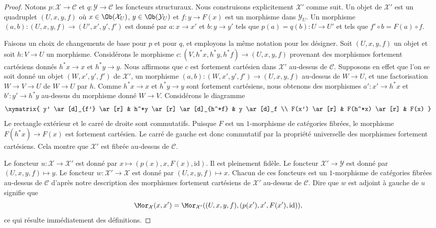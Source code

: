 \begin{proof}
Notons $p : \mathcal{X} \to \mathcal{C}$ et
$q : \mathcal{Y} \to \mathcal{C}$ les foncteurs structuraux.
Nous construisons explicitement $\mathcal{X}'$ comme suit.
Un objet de $\mathcal{X}'$ est un quadruplet $(U, x, y, f)$ où
$x \in \Ob(\mathcal{X}_U)$, $y \in \Ob(\mathcal{Y}_U)$
et $f : y \to F(x)$ est un morphisme dans $\mathcal{Y}_U$.
Un morphisme $(a, b) : (U, x, y, f) \to (U', x', y', f')$ est donné
par $a : x \to x'$ et $b : y \to y'$ tels que
$p(a) = q(b) : U \to U'$ et tels que
$f' \circ b = F(a) \circ f$.

\medskip\noindent
Faisons un choix de changements de base pour $p$ et pour $q$, et employons
la même notation pour les désigner.
Soit $(U, x, y, f)$ un objet et soit $h : V \to U$ un morphisme.
Considérons le morphisme
$c : (V, h^*x, h^*y, h^*f) \to (U, x, y, f)$
provenant des morphismes fortement cartésiens donnés
$h^*x \to x$ et $h^*y \to y$.
Nous affirmons que $c$ est fortement cartésien dans $\mathcal{X}'$
au-dessus de $\mathcal{C}$.
Supposons en effet que l'on se soit donné un objet
$(W, x', y', f')$ de $\mathcal{X}'$, un morphisme
$(a, b) : (W, x', y', f') \to (U, x, y, f)$ au-dessus de
$W \to U$, et une factorisation $W \to V \to U$ de $W \to U$ par $h$.
Comme $h^*x \to x$ et $h^*y \to y$ sont fortement cartésiens, nous obtenons
des morphismes $a' : x' \to h^*x$ et $b' : y' \to h^*y$ au-dessus du
morphisme donné $W \to V$. Considérons le diagramme
$$
\xymatrix{
y' \ar[d]_{f'} \ar[r] & h^*y \ar[r] \ar[d]_{h^*f} & y \ar[d]_f \\
F(x') \ar[r] & F(h^*x) \ar[r] & F(x)
}
$$
Le rectangle extérieur et le carré de droite sont commutatifs.
Puisque $F$ est un $1$-morphisme de catégories fibrées, le morphisme
$F(h^*x) \to F(x)$ est fortement cartésien.
Le carré de gauche est donc commutatif par la propriété universelle des
morphismes fortement cartésiens. Cela montre que $\mathcal{X}'$
est fibrée au-dessus de $\mathcal{C}$.

\medskip\noindent
Le foncteur $u : \mathcal{X} \to \mathcal{X}'$ est donné par
$x \mapsto (p(x), x, F(x), \text{id})$. Il est pleinement fidèle.
Le foncteur $\mathcal{X}' \to \mathcal{Y}$ est donné par
$(U, x, y, f) \mapsto y$. Le foncteur
$w : \mathcal{X}' \to \mathcal{X}$ est donné par
$(U, x, y, f) \mapsto x$. Chacun de ces foncteurs est un
$1$-morphisme de catégories fibrées au-dessus de $\mathcal{C}$ d'après
notre description des morphismes fortement cartésiens de $\mathcal{X}'$
au-dessus de $\mathcal{C}$. Dire que $w$ est adjoint à gauche de $u$ signifie que
$$
\Mor_\mathcal{X}(x, x') =
\Mor_{\mathcal{X}'}((U, x, y, f), (p(x'), x', F(x'), \text{id})),
$$
ce qui résulte immédiatement des définitions.


\end{proof}
